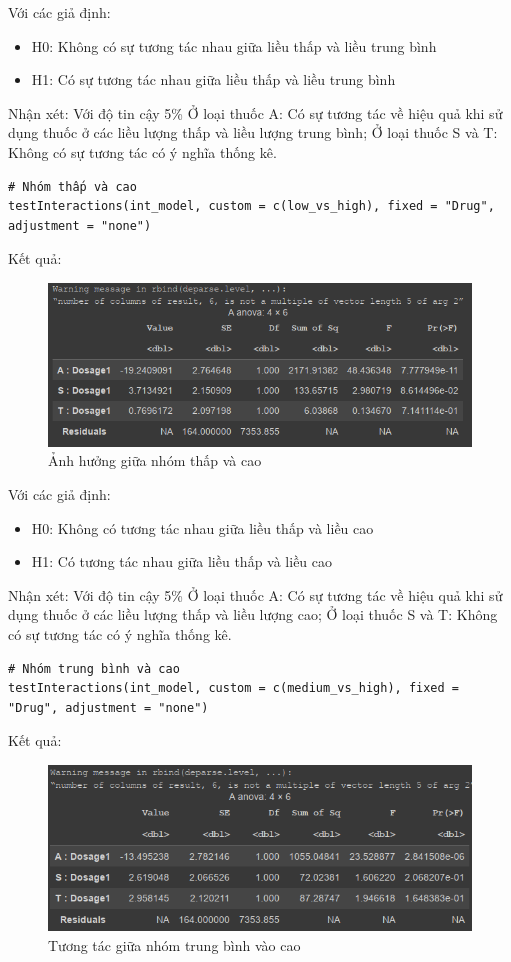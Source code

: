 \begin{itemize}
\begin{itemize}
        Với các giả định:
        \begin{itemize}
            \item H0: Không có sự tương tác nhau giữa liều thấp và liều trung bình
            \item H1: Có sự tương tác nhau giữa liều thấp và liều trung bình
        \end{itemize}
        Nhận xét: Với độ tin cậy 5\% Ở loại thuốc A: Có sự tương tác về hiệu quả khi sử dụng thuốc ở các liều lượng thấp và liều lượng trung bình; Ở loại thuốc S và T: Không có sự tương tác có ý nghĩa thống kê.
    \begin{lstlisting}
# Nhóm thấp và cao
testInteractions(int_model, custom = c(low_vs_high), fixed = "Drug", adjustment = "none")
    \end{lstlisting}
    Kết quả:
    \begin{figure}[H]
        \centering
        \includegraphics[width=0.8\linewidth]{part01_figures/31.png}
        \caption{Ảnh hưởng giữa nhóm thấp và cao}
        \label{fig:Ảnh hưởng giữa nhóm thấp và cao}
    \end{figure}
    Với các giả định:
        \begin{itemize}
            \item H0: Không có tương tác nhau giữa liều thấp và liều cao
            \item H1: Có tương tác nhau giữa liều thấp và liều cao
        \end{itemize}
    Nhận xét: Với độ tin cậy 5\% Ở loại thuốc A: Có sự tương tác về hiệu quả khi sử dụng thuốc ở các liều lượng thấp và liều lượng cao; Ở loại thuốc S và T: Không có sự tương tác có ý nghĩa thống kê.
    \begin{lstlisting}
# Nhóm trung bình và cao
testInteractions(int_model, custom = c(medium_vs_high), fixed = "Drug", adjustment = "none")
    \end{lstlisting}
    Kết quả:
    \begin{figure}[H]
        \centering
        \includegraphics[width=0.8\linewidth]{part01_figures/32.png}
        \caption{Tương tác giữa nhóm trung bình vào cao}
        \label{fig:Tương tác giữa nhóm trung bình vào cao}
    \end{figure}
    

\end{itemize}
\end{itemize}
